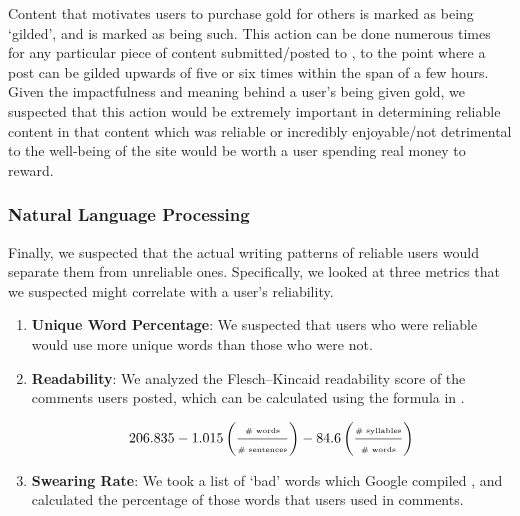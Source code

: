 Content that motivates users to purchase \reddit{} gold for others is marked as
being `gilded', and is marked as being such. This action can be done numerous
times for any particular piece of content submitted/posted to \reddit{}, to the
point where a post can be gilded upwards of five or six times within the span of
a few hours. Given the impactfulness and meaning behind a user's being given
\reddit{} gold, we suspected that this action would be extremely important in
determining reliable content in that content which was reliable or incredibly
enjoyable/not detrimental to the well-being of the site would be worth a user
spending real money to reward.



\subsubsection{Natural Language Processing} %
\label{ssub:natural_language_processing}

Finally, we suspected that the actual writing patterns of reliable users would
separate them from unreliable ones. Specifically, we looked at three metrics that we
suspected might correlate with a user's reliability.

\begin{enumerate}
    \item \textbf{Unique Word Percentage}: We suspected that users who were
      reliable would use more unique words than those who were not.

    \item \textbf{Readability}: We analyzed the Flesch--Kincaid readability
      \cite{kincaid1975derivation} score of the comments users posted, which can
      be calculated using the formula in .

    \begin{equation} \label{eq:fk_eq}
        206.835 - 1.015 \left(\frac{\text{\tiny \# words}}{\text{\tiny \# sentences}}\right) - 84.6 \left(\frac{\text{\tiny \# syllables}}{\text{\tiny \# words}}\right)
    \end{equation}

    \item \textbf{Swearing Rate}: We took a list of `bad' words which Google
      compiled \cite{googlebadwords}, and calculated the percentage of those
      words that users used in comments.

\end{enumerate}

